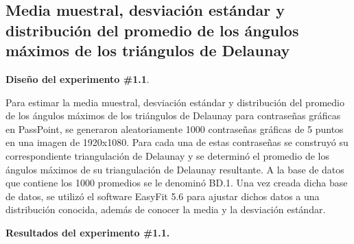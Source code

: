 \documentclass[12pt]{report}
\begin{document}
\subsection{Media muestral, desviación estándar y distribución del promedio de los ángulos máximos de los triángulos de Delaunay }
	\textbf{Diseño del experimento \#1.1}.
	
	 Para estimar la media muestral, desviación estándar y distribución del promedio de los ángulos máximos de los triángulos de Delaunay para contraseñas gráficas en PassPoint, se generaron aleatoriamente 1000 contraseñas gráficas de 5 puntos en una imagen de 1920x1080. Para cada una de estas contraseñas se  construyó  su correspondiente triangulación  de Delaunay  y se  determinó el promedio  de los ángulos máximos de su triangulación de Delaunay resultante. A la base de datos que contiene los 1000 promedios se le denominó BD.1. Una vez creada dicha base de datos, se utilizó el software EasyFit 5.6 para ajustar dichos datos a una distribución conocida, además de conocer la media y la desviación estándar.
	 
	 \textbf{Resultados del experimento \#1.1.}
	 
\end{document}
